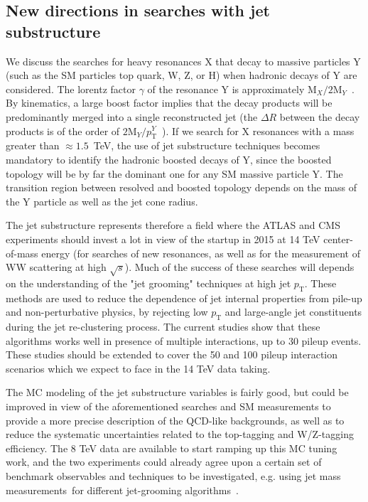 \documentclass{PoS}
\begin{document}
\subsection{New directions in searches with jet substructure}
We discuss the searches for heavy resonances X that decay to massive particles Y (such as the SM particles top quark, W, Z, or H) when hadronic decays of Y are considered. The lorentz factor $\gamma$ of the resonance 
Y is approximately $\mbox{M}_{X} / 2 \mbox{M}_{Y}$~\cite{Gouzevitch:2013qca}. By kinematics, a large boost factor implies 
that the decay products will be predominantly merged into a single reconstructed jet (the $\Delta R$ between the decay 
products is of the order of $2 \mbox{M}_{Y} / p_\mathrm{T}^{Y}$~\cite{ATLAS-CONF-2012-065}). If we search for X resonances with a mass greater than $\approx 1.5$~TeV, the use of jet substructure techniques becomes mandatory to identify the hadronic boosted decays of Y, since the boosted topology will be by far the dominant one for any SM massive particle Y. The transition region between resolved and boosted topology depends on the mass of the Y particle as well as the jet cone radius.

The jet substructure represents therefore a field where the ATLAS and CMS experiments should invest a lot in view of the startup in 2015 at 14 TeV center-of-mass energy (for searches of new resonances, as well as for the measurement of 
WW scattering at high $\sqrt{s}$). Much of the success of these searches will depends on the understanding of the "jet grooming" techniques at high jet $p_\mathrm{T}$. These methods are used to reduce the dependence of jet internal properties from pile-up and non-perturbative physics, by rejecting low $p_\mathrm{T}$ and large-angle jet constituents during the jet re-clustering process.
The current studies show that these algorithms works well in presence of multiple interactions, up to 30 pileup events. 
These studies should be extended to cover the 50 and 100 pileup interaction scenarios which we expect to face in the 
14 TeV data taking.

The MC modeling of the jet substructure variables is fairly good, but could be improved in view of the aforementioned searches and SM measurements to provide a more precise description of the QCD-like backgrounds, as well as to reduce the systematic uncertainties related to the top-tagging and W/Z-tagging efficiency.
The 8 TeV data are available to start ramping up this MC tuning work, and the two experiments could already 
agree upon a certain set of benchmark observables and techniques to be investigated, e.g. using jet mass measurements~for different jet-grooming algorithms~\cite{Chatrchyan:2013rla,ATLAS:2012am}.
\end{document}
